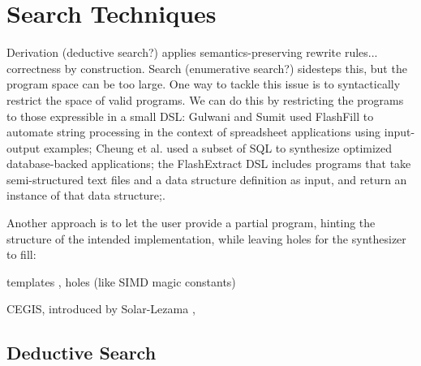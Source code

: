 \section{Search Techniques}
\label{sec:search-techniques}

 Derivation (deductive search?)
applies semantics-preserving rewrite rules... correctness by construction.
Search (enumerative search?) sidesteps this, but the program space can be too
large. One way to tackle this issue is to syntactically restrict the space of
valid programs. We can do this by restricting the programs to those expressible
in a small DSL:  Gulwani and
Sumit \cite{Gulwani:2011} used FlashFill to automate string processing in the
context of spreadsheet applications using input-output examples; Cheung et al.
\cite{Cheung:2013} used a subset of SQL to synthesize optimized database-backed
applications; the FlashExtract DSL \cite{Le:2014} includes programs that take
semi-structured text files and a data structure definition as input, and return
an instance of that data structure;.

Another approach is to let the user provide a partial program, hinting the
structure of the intended implementation, while leaving holes for the
synthesizer to fill:

templates \cite{Srivastava:2012},
holes (like SIMD magic constants) \cite{Solar-Lezama:2008}

\ac{CEGIS}, introduced by Solar-Lezama \cite{Solar-Lezama:2008},

\subsection{Deductive Search}
\label{sec:deductive-search}


